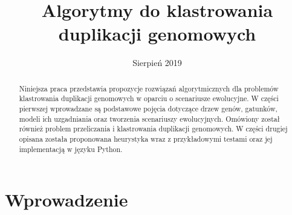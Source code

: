 \documentclass[licencjacka]{pracamgr}
\title{Algorytmy do klastrowania duplikacji genomowych}
\date{Sierpień 2019}
\begin{document}
\maketitle


\begin{abstract}
   Niniejsza praca przedstawia propozycje rozwiązań algorytmicznych dla problemów klastrowania duplikacji genomowych w oparciu o scenariusze ewolucyjne. W części pierwszej wprowadzane są podstawowe pojęcia dotyczące drzew genów, gatunków, modeli ich uzgadniania oraz tworzenia scenariuszy ewolucyjnych. Omówiony został również problem przeliczania i klastrowania duplikacji genomowych. W części drugiej opisana została proponowana heurystyka wraz z przykładowymi testami oraz jej implementacją w języku Python.
\end{abstract}


\renewcommand{\contentsname}{Spis Treści}
\tableofcontents

\chapter*{Wprowadzenie}
\end{document}
